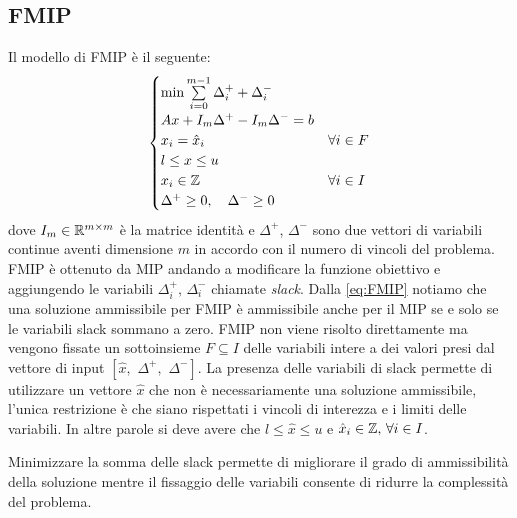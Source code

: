 \subsection{FMIP}%
\label{sub:FMIP}
Il modello di FMIP è il seguente:
\begin{equation} \label{eq:FMIP}
    \begin{cases}
        \min \sum\limits_{i=0}^{m-1} \Delta_i^+ + \Delta_i^- \\
        Ax + I_m \Delta^+ - I_m \Delta^- = b \\
        x_i = \hat x_i & \forall i \in F \\
        l \leq x \leq u\\
        x_i \in \mathbb{Z} & \forall i \in I\\
        \Delta^+ \geq 0,\quad \Delta^- \geq 0
    \end{cases}
\end{equation}
dove $I_m\in \mathbb{R}^{m\times m}$ è la matrice identità e $\Delta^+$, $\Delta^-$
sono due vettori di variabili continue aventi dimensione $m$ in accordo
con il numero di vincoli del problema.
FMIP è ottenuto da MIP andando a modificare la funzione obiettivo e
aggiungendo le variabili $\Delta^+_i,\,\Delta^-_i$ chiamate \emph{slack}.
Dalla \ref{eq:FMIP} notiamo che una soluzione ammissibile per FMIP
è ammissibile anche per il MIP se e solo se le variabili slack sommano
a zero.
FMIP non viene risolto direttamente ma vengono fissate un sottoinsieme
$F\subseteq I$ delle variabili intere a dei valori 
presi dal vettore di input $[\hat x,\,\, \Delta^+,\,\, \Delta^-]$.
La presenza delle variabili di slack permette di utilizzare un vettore $\hat x$ 
che non è necessariamente una soluzione ammissibile, l'unica restrizione 
è che siano rispettati i vincoli di interezza e i limiti delle variabili.
In altre parole si deve avere che $l \leq \hat x \leq u$ e $\hat x_i \in \mathbb{Z},\, \forall i\in I$.

Minimizzare la somma delle slack permette di migliorare il grado di ammissibilità
della soluzione mentre il fissaggio delle variabili consente di ridurre la
complessità del problema.


